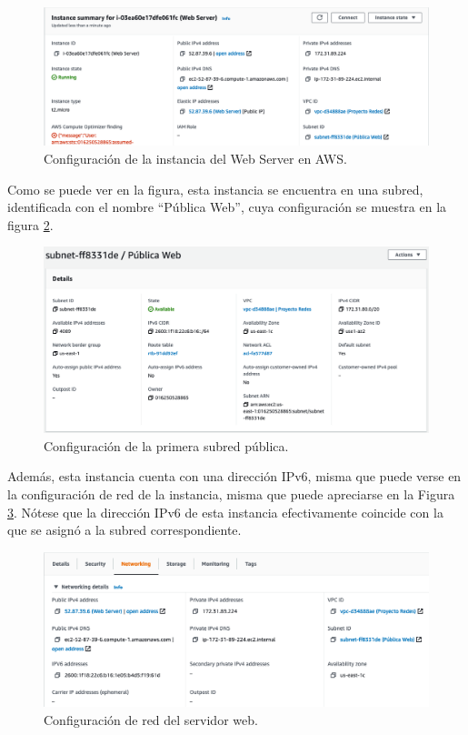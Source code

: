\documentclass{article}
\begin{document}
\begin{figure}[H]
  \centering
  \includegraphics[width=\textwidth]{web/instancia}
  \caption{Configuraci\'on de la instancia del Web Server
           en AWS.}
  \label{fig:web-instancia}
\end{figure}

Como se puede ver en la figura, esta instancia se
encuentra en una subred, identificada con el nombre
``P\'ublica Web'', cuya configuraci\'on se muestra
en la figura \ref{fig:web-subred}.

\begin{figure}[H]
  \centering
  \includegraphics[width=\textwidth]{web/subred}
  \caption{Configuraci\'on de la primera subred p\'ublica.}
  \label{fig:web-subred}
\end{figure}

Adem\'as, esta instancia cuenta con una direcci\'on IPv6,
misma que puede verse en la configuraci\'on de red de la
instancia, misma que puede apreciarse en la Figura
\ref{fig:web-ipv6}.   N\'otese que la direcci\'on IPv6
de esta instancia efectivamente coincide con la que se
asign\'o a la subred correspondiente.

\begin{figure}[H]
  \centering
  \includegraphics[width=\textwidth]{web/ipv6}
  \caption{Configuraci\'on de red del servidor web.}
  \label{fig:web-ipv6}
\end{figure}
\end{document}
